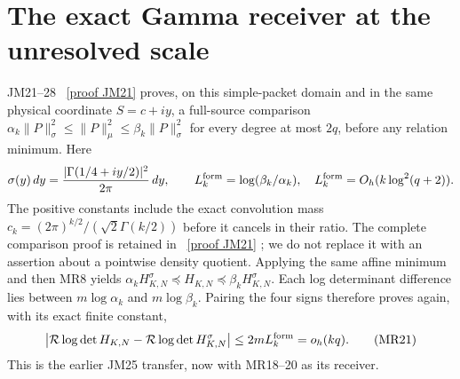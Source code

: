 \documentclass[11pt]{article}
\begin{document}
\section{The exact Gamma receiver at the unresolved scale}
JM21--28 \cite{mrroot:JM}%
~\href{https://github.com/KokunoYumeto/zeta-function-research-reader/blob/5992ad50c0f2a06921f1fcaded7b4e38097c0739/workbenches/splitzero-tandem/continuations/20260920-original-kernel-mixed-determinants/providers/JOINT_MINIMUM_RECEIVERS.tex\#L286}{[proof JM21]}%
{} proves, on this simple-packet domain and in the
same physical coordinate $S=c+iy$, a full-source comparison
$\alpha_k\|P\|_\sigma^2\le\|P\|_\mu^2\le\beta_k\|P\|_\sigma^2$
for every degree at most $2q$, before any relation minimum. Here
\[
 \sigma(y)\,dy=\frac{|\Gamma(1/4+iy/2)|^2}{2\pi}\,dy,
 \qquad L_k^{\rm form}=\log(\beta_k/\alpha_k),
 \quad L_k^{\rm form}=O_h(k\log^2(q+2)).
\]
The positive constants include the exact convolution mass
$c_k=(2\pi)^{k/2}/(\sqrt2\Gamma(k/2))$ before it cancels in their
ratio. The complete comparison proof is retained in \cite{mrroot:JM}%
~\href{https://github.com/KokunoYumeto/zeta-function-research-reader/blob/5992ad50c0f2a06921f1fcaded7b4e38097c0739/workbenches/splitzero-tandem/continuations/20260920-original-kernel-mixed-determinants/providers/JOINT_MINIMUM_RECEIVERS.tex\#L286}{[proof JM21]}%
{}; we
do not replace it with an assertion about a pointwise density quotient.
Applying the same affine minimum and then MR8 yields
$\alpha_k H_{K,N}^\sigma\preceq H_{K,N}\preceq\beta_k H_{K,N}^\sigma$.
Each log determinant difference lies between $m\log\alpha_k$ and
$m\log\beta_k$. Pairing the four signs therefore proves again, with
its exact finite constant,
\[
 \left|\mathcal R\log\det H_{K,N}
       -\mathcal R\log\det H_{K,N}^\sigma\right|
       \le2mL_k^{\rm form}=o_h(kq).\tag{MR21}
\]
This is the earlier JM25 transfer, now with MR18--20 as its receiver.
\end{document}
